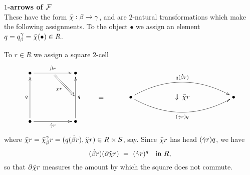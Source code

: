 \medskip\noindent
{\large{\bf $1$-arrows of $\mathcal{F}$}}\\
These have the form $\bar{\chi} : \beta \to \gamma$, 
and are $2$-natural transformations which make the following assignments. 
To the object $\bullet$ we assign an element 
$q = q_{\beta}^{\gamma} = \bar{\chi}(\bullet) \in R$.

\noindent
To $r \in R$ we assign a square $2$-cell
$$
{\xy
\xymatrix{
  \bullet \ar[rr]^{\db r} 
    & \ar @{=>} [dr]_{\barch r}
      & \bullet 
        & & \\
    & & & \equiv
          & \\
  \bullet \ar[uu]^q \ar[rr]_{\dg r} 
    & & \bullet \ar[uu]_q
        & & \\
}
\endxy}
{\xy
\xymatrix{
  && && \\
  \bullet  \ar@/^5ex/[rrrr]^{q(\db r)} 
           \ar@/_5ex/[rrrr]_{(\dg r)q} 
  && \Downarrow\, \barch r
     && \bullet \\
  && && \\
}
\endxy}
$$
where 
$\bar{\chi} r = \bar{\chi}_{\beta}^{\gamma} r = (q(\dot{\beta} r),\ddot{\chi} r) \in R \ltimes S$, 
say.
Since $\bar{\chi} r$ has head $(\dot{\gamma} r)q$, we have
\begin{equation} \label{eq:partial-ddch-r} 
(\dot{\beta} r)(\partial \ddot{\chi} r) ~=~ (\dot{\gamma} r)^q \quad\mbox{in}~R,
\end{equation}
so that $\partial \ddot{\chi} r$ measures the amount by which the square 
does not commute.


